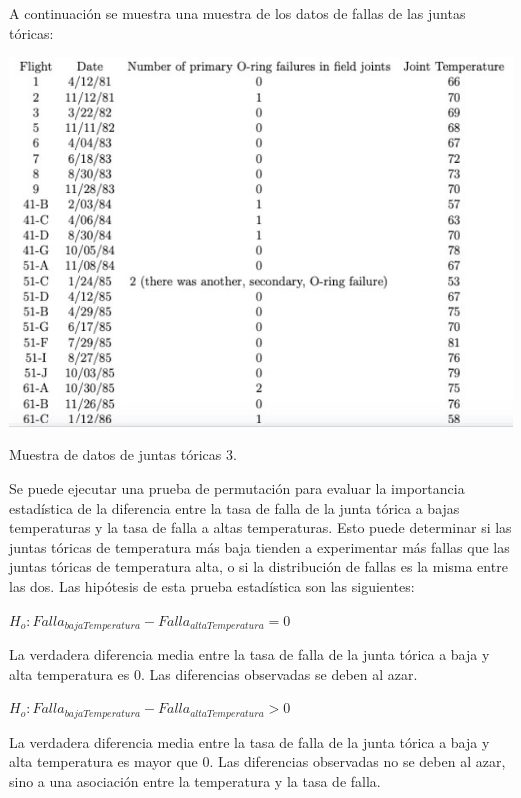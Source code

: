 A continuación se muestra una muestra de los datos de fallas de las juntas
tóricas:

\begin{center}  
\includegraphics{figures/challenger_data.jpg}
\end{center}

Muestra de datos de juntas tóricas 3.

Se puede ejecutar una prueba de permutación para evaluar la importancia
estadística de la diferencia entre la tasa de falla de la junta tórica a bajas
temperaturas y la tasa de falla a altas temperaturas. Esto puede determinar si
las juntas tóricas de temperatura más baja tienden a experimentar más fallas que
las juntas tóricas de temperatura alta, o si la distribución de fallas es la
misma entre las dos. Las hipótesis de esta prueba estadística son las
siguientes:


\begin{center}  
$H_o: Falla_{bajaTemperatura} - Falla_{altaTemperatura} = 0$
\end{center}


La verdadera diferencia media entre la tasa de falla de la junta tórica a baja y
alta temperatura es 0. Las diferencias observadas se deben al azar.


\begin{center}  
$H_o: Falla_{bajaTemperatura} - Falla_{altaTemperatura} > 0$
\end{center}


La verdadera diferencia media entre la tasa de falla de la junta tórica a baja y
alta temperatura es mayor que 0. Las diferencias observadas no se deben al azar,
sino a una asociación entre la temperatura y la tasa de falla.

